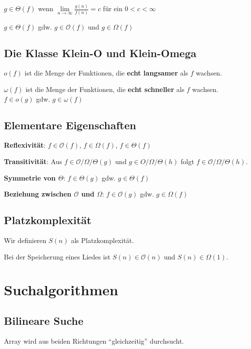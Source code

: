 \documentclass[12pt]{article}
\begin{document}
$g \in \Theta(f)$ wenn \(\lim\limits_{n \to \infty}\frac{g(n)}{f(n)}=c\) für ein $0 < c < \infty$

$g \in \Theta(f)$ gdw. $g \in \mathcal O(f)$ und $g \in \Omega(f)$

\subsection{Die Klasse Klein-O und Klein-Omega}

$o(f)$ ist die Menge der Funktionen, die \textbf{echt langsamer} als $f$ wachsen.

$\omega(f)$ ist die Menge der Funktionen, die \textbf{echt schneller} als $f$ wachsen.\\

$f \in o(g)$ gdw. $g \in \omega(f)$

\subsection{Elementare Eigenschaften}

\textbf{Reflexivität}: $f \in \mathcal O(f)$, $f \in \Omega(f)$, $f \in \Theta(f)$

\textbf{Transitivität}: Aus $f \in \mathcal O/\Omega/\Theta(g)$ und $g \in O/\Omega/\Theta(h)$ folgt $f \in \mathcal O/\Omega/\Theta(h)$.

\textbf{Symmetrie von $\Theta$}: $f \in \Theta(g)$ gdw. $g \in \Theta(f)$

\textbf{Beziehung zwischen $\mathcal O$ und $\Omega$}: $f \in \mathcal O(g)$ gdw. $g \in \Omega(f)$

\subsection{Platzkomplexität}

Wir definieren $S(n)$ als Platzkomplexität.

Bei der Speicherung eines Liedes ist $S(n) \in \mathcal O(n)$ und $S(n) \in \Omega(1)$.

\section{Suchalgorithmen}

\subsection{Bilineare Suche}

Array wird aus beiden Richtungen \enquote{gleichzeitig} durchsucht.
\end{document}
